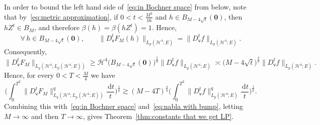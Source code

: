 \documentclass[11pt,reqno]{amsart}
\newcommand{\cH}{\mathcal{H}}
\newcommand{\vv}{\mathsf{v}}
\newcommand{\ud}[0]{\,\mathrm{d}}
\newcommand{\0}{\mathbf{0}}
\renewcommand{\1}{\mathbf 1}
\renewcommand{\ge}{\geqslant}
\theoremstyle{remark}
\begin{document}
In order to bound the left hand side of~\eqref{eq:in Bochner space} from below, note  that by~\eqref{eq:metric approximation}, if $0<t<\frac{M^2}{16}$ and $h\in B_{M-4\sqrt{t}}(\0)$, then  $hZ^t\in B_M$, and therefore $\beta(h)=\beta(hZ^t)=1$. Hence,
$$
\forall\, h\in B_{M-4\sqrt{t}}(\0),\qquad \|D^t_\vv F_M(h)\|_{L_p(\cH^4;E)}=\|D^t_\vv f\|_{L_p(\cH^4;E)}.
$$
Consequently,
$$
\|D^t_\vv F_M\|_{L_q(\cH^4;L_p(\cH^4;E))}\ge \cH^4\big(B_{M-4\sqrt{t}}(\0)\big)^{\frac{1}{q}}\|D^t_\vv f\|_{L_p(\cH^4;E)}\asymp \Big(M-4\sqrt{t}\Big)^{\frac{4}{q}}\|D^t_\vv f\|_{L_p(\cH^4;E)}.
$$
Hence, for every $0<T<\frac{M}{4}$ we have
$$
\bigg(\int_0^{T^2} \|D_{\vv}^tF_M\|_{L_q(\cH^4;L_p(\cH^4;E))}^{q}\frac{\ud t}{t}\bigg)^{\frac1{q}}\gtrsim (M-4T)^{\frac{4}{q}}\bigg(\int_0^{T^2} \|D_{\vv}^tf\|_{L_p(\cH^4;E)}^{q}\frac{\ud t}{t}\bigg)^{\frac1{q}}.
$$
Combining this with~\eqref{eq:in Bochner space} and~\eqref{eq:nabla with bump}, letting $M\to \infty$ and then $T\to \infty$, gives Theorem~\ref{thm:constants that we get LP}.
\end{document}
